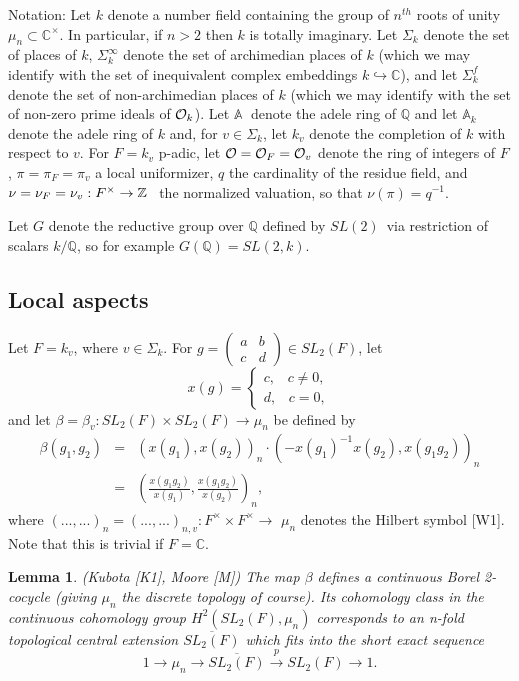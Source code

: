 \documentclass[amsfonts,12pt]{article}
\newtheorem{lemma}[theorem]{Lemma}
\def\aaa{\mathbb{A}}
\def\qqq{\mathbb{Q}}
\def\ccc{\mathbb{C}}
\begin{document}
Notation: Let $k$ denote a number field containing the group of $n^{th}$
roots of unity $\mu _n\subset \ccc ^{\times }$. In particular, if $n>2$
then $k$ is totally imaginary. Let $\Sigma _k$ denote the set of places of $k
$, $\Sigma _k^\infty $ denote the set of archimedian places of $k$ (which we
may identify with the set of inequivalent complex embeddings $k\hookrightarrow 
\ccc $), and let $\Sigma _k^f$ denote the set of non-archimedian places of 
$k$ (which we may identify with the set of non-zero prime ideals of $%
{\cal{O}}_k$). Let $\aaa $ $\;$denote the adele ring of $\qqq$ and
let $\aaa _k$ denote the adele ring of $k$ and, for $v\in \Sigma _k$, let $%
k_v$ denote the completion of $k$ with respect to $v$. For $F=k_v$ p-adic,
let ${\cal{O}}={\cal{O}}_F={\cal{O}}_v$ denote the ring of integers of 
$F$, $\pi =\pi _F=\pi _v$ a local uniformizer, $q$ the cardinality of the
residue field, and $\nu =\nu _F=\nu _v:F^{\times }\rightarrow {\Bbb{Z}}$ \ the
normalized valuation, so that $\nu (\pi )=q^{-1}$.

Let $G$ denote the reductive group over $\qqq$ defined by $SL(2)$\ via
restriction of scalars $k/\qqq$, so for example $G(\qqq)=SL(2,k)$.

\subsection{Local aspects}

Let $F=k_v$, where $v\in \Sigma _k$. For $g=\left( 
\begin{array}{cc}
a & b \\ 
c & d
\end{array}
\right) \in SL_2(F)$, let 
\[
x(g)=\left\{ 
\begin{array}{c}
c,\;\;\;c\neq 0, \\ 
d,\;\;\;c=0,
\end{array}
\right. 
\]
and let $\beta =\beta _v:SL_2(F)\times SL_2(F)\rightarrow \mu _n$ be defined
by 
\begin{eqnarray*}
\beta (g_1,g_2) &=&(x(g_1),x(g_2))_n\cdot (-x(g_1)^{-1}x(g_2),x(g_1g_2))_n \\
&=&(\frac{x(g_1g_2)}{x(g_1)},\frac{x(g_1g_2)}{x(g_2)})_n,
\end{eqnarray*}
where $(...,...)_n=(...,...)_{n,v}:F^{\times }\times F^{\times }\rightarrow $
$\mu _n$ denotes the Hilbert symbol [W1]. Note that this is trivial if $F=%
\ccc $.

\begin{lemma}
(Kubota [K1], Moore [M]) The map $\beta $ defines a continuous Borel
2-cocycle (giving $\mu _n$ the discrete topology of course). Its cohomology
class in the continuous cohomology group $H^2(SL_2(F),\mu _n)$ corresponds
to an n-fold topological central extension $\overline{SL_2(F)}$ which fits
into the short exact sequence 
\[
1\rightarrow \mu _n\rightarrow \overline{SL_2(F)}\stackrel{p}{\rightarrow }%
SL_2(F)\rightarrow 1.
\]
\end{lemma}
\end{document}
